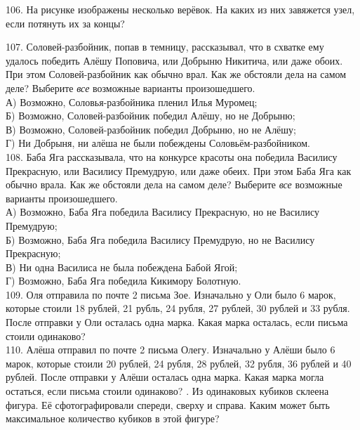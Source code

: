 106. На рисунке изображены несколько верёвок. На каких из них завяжется узел, если потянуть их за концы?
\begin{center}
\begin{figure}[ht!]
\end{figure}
\end{center}
107. Соловей-разбойник, попав в темницу, рассказывал, что в схватке ему удалось победить Алёшу Поповича, или Добрыню Никитича, или даже обоих. При этом Соловей-разбойник как обычно врал. Как же обстояли дела на самом деле? Выберите {\it все} возможные варианты произошедшего.\\
А) Возможно, Соловья-разбойника пленил Илья Муромец;\\
Б) Возможно, Соловей-разбойник победил Алёшу, но не Добрыню;\\
В) Возможно, Соловей-разбойник победил Добрыню, но не Алёшу;\\
Г) Ни Добрыня, ни алёша не были побеждены Соловьём-разбойником.\\
108. Баба Яга рассказывала, что на конкурсе красоты она победила Василису Прекрасную, или Василису Премудрую, или даже обеих. При этом Баба Яга как обычно врала. Как же обстояли дела на самом деле? Выберите {\it все} возможные варианты произошедшего.\\
А) Возможно, Баба Яга победила Василису Прекрасную, но не Василису Премудрую;\\
Б) Возможно, Баба Яга победила Василису Премудрую, но не Василису Прекрасную;\\
В) Ни одна Василиса не была побеждена Бабой Ягой;\\
Г) Возможно, Баба Яга победила Кикимору Болотную.\\
109. Оля отправила по почте 2 письма Зое. Изначально у Оли было 6 марок, которые стоили 18 рублей, 21 рубль, 24 рубля, 27 рублей, 30 рублей и 33 рубля. После отправки у Оли осталась одна марка. Какая марка осталась, если письма стоили одинаково?\\
110. Алёша отправил по почте 2 письма Олегу. Изначально у Алёши было 6 марок, которые стоили 20 рублей, 24 рубля, 28 рублей, 32 рубля, 36 рублей и 40 рублей. После отправки у Алёши осталась одна марка. Какая марка могла остаться, если письма стоили одинаково?
\newpage
{}. Из одинаковых кубиков склеена фигура. Её сфотографировали спереди, сверху и справа. Каким может быть максимальное количество кубиков в этой фигуре?
\begin{center}
\begin{figure}[ht!]
\end{figure}
\end{center}
